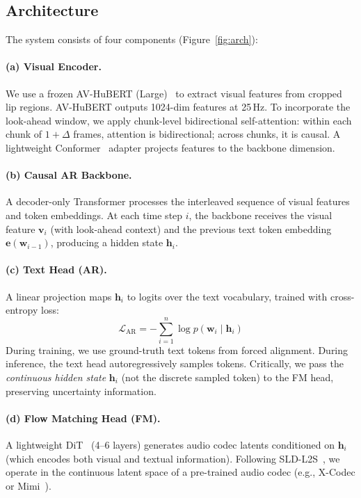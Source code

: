 \documentclass{article}
\begin{document}
\subsection{Architecture}

The system consists of four components (Figure~\ref{fig:arch}):

\paragraph{(a) Visual Encoder.} We use a frozen AV-HuBERT (Large)~\cite{avhubert} to extract visual features from cropped lip regions. AV-HuBERT outputs 1024-dim features at 25\,Hz. To incorporate the look-ahead window, we apply chunk-level bidirectional self-attention: within each chunk of $1{+}\Delta$ frames, attention is bidirectional; across chunks, it is causal. A lightweight Conformer~\cite{conformer} adapter projects features to the backbone dimension.

\paragraph{(b) Causal AR Backbone.} A decoder-only Transformer processes the interleaved sequence of visual features and token embeddings. At each time step $i$, the backbone receives the visual feature $\mathbf{v}_i$ (with look-ahead context) and the previous text token embedding $\mathbf{e}(\mathbf{w}_{i-1})$, producing a hidden state $\mathbf{h}_i$.

\paragraph{(c) Text Head (AR).} A linear projection maps $\mathbf{h}_i$ to logits over the text vocabulary, trained with cross-entropy loss:
\begin{equation}
    \mathcal{L}_{\text{AR}} = -\sum_{i=1}^{n} \log p(\mathbf{w}_i \mid \mathbf{h}_i)
\end{equation}
During training, we use ground-truth text tokens from forced alignment. During inference, the text head autoregressively samples tokens. Critically, we pass the \textit{continuous hidden state} $\mathbf{h}_i$ (not the discrete sampled token) to the FM head, preserving uncertainty information.

\paragraph{(d) Flow Matching Head (FM).} A lightweight DiT~\cite{dit} (4--6 layers) generates audio codec latents conditioned on $\mathbf{h}_i$ (which encodes both visual and textual information). Following SLD-L2S~\cite{sldl2s}, we operate in the continuous latent space of a pre-trained audio codec (e.g., X-Codec or Mimi~\cite{moshi}).
\end{document}

